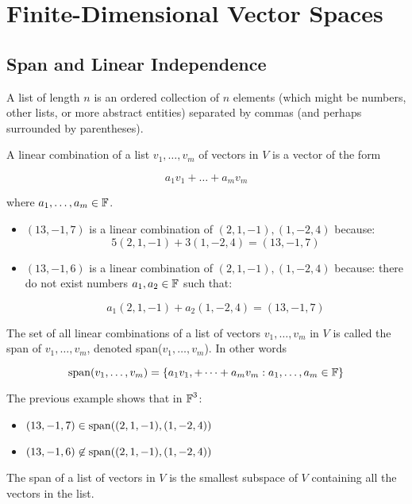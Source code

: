 
\section{Finite-Dimensional Vector Spaces}

\subsection{Span and Linear Independence}

\begin{definition}[List]
    A list of length $n$ is an ordered collection of $n$ elements (which might be
    numbers, other lists, or more abstract entities) separated by commas (and perhaps surrounded
    by parentheses).
\end{definition}

\begin{definition}
    A linear combination of a list $v_1, \ldots, v_m$ of vectors in $V$ is a vector
    of the form

    \[ a_1 v_1 + \ldots + a_m v_m \]

    where $a_1, \ldots, a_m \in \operatorname{\mathbb{F}}$.
\end{definition}

\begin{itemize}
    \item $(13, -1, 7)$ is a linear combination of $(2, 1, -1), (1, -2, 4)$ because:
    \[ 5(2, 1, -1) + 3(1, -2, 4) = (13, -1, 7) \]

    \item $(13, -1, 6)$ is a linear combination of $(2, 1, -1), (1, -2, 4)$ because:
    there do not exist numbers $a_1, a_2 \in \operatorname{\mathbb{F}}$ such that:
    
    \[ a_1(2, 1, -1) + a_2(1, -2, 4) = (13, -1, 7) \]
\end{itemize}

\begin{definition}[Span]
    The set of all linear combinations of a list of vectors $v_1, \ldots, v_m$ in $V$
    is called the span of $v_1, \ldots, v_m$, denoted span($v_1, \ldots, v_m$). In other words

    \[ \operatorname{span}(v_1, \ldots, v_m) = \{ a_1 v_1, + \dots + a_m v_m : a_1, \ldots, a_m \in \operatorname{\mathbb{F}} \} \]
\end{definition}

The previous example shows that in $\operatorname{\mathbb{F}}^3$:

\begin{itemize}
    \item $(13, -1, 7) \in \operatorname{span}((2, 1, -1), (1, -2, 4))$
    \item $(13, -1, 6) \not \in \operatorname{span}((2, 1, -1), (1, -2, 4))$
\end{itemize}
\begin{definition}
    The span of a list of vectors in $V$ is the smallest subspace of $V$
    containing all the vectors in the list.
\end{definition}

